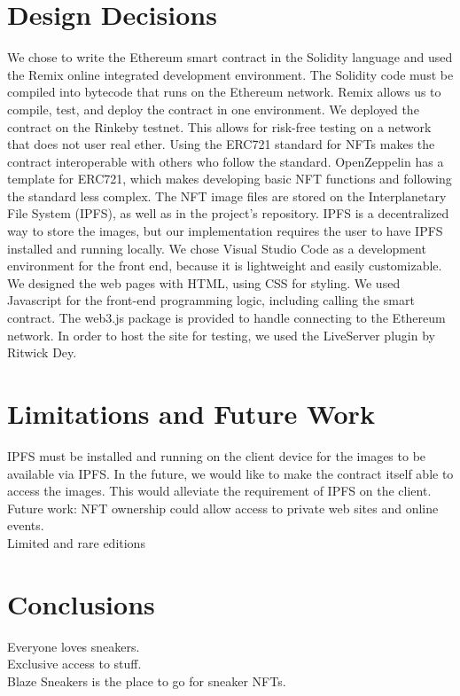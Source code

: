 \documentclass{article}
\begin{document}
\section{Design Decisions}
    We chose to write the Ethereum smart contract in the Solidity language and used the Remix online integrated development environment.
    The Solidity code must be compiled into bytecode that runs on the Ethereum network.
    Remix allows us to compile, test, and deploy the contract in one environment.
    We deployed the contract on the Rinkeby testnet. This allows for risk-free testing on a network that does not user real ether.
    \newline
    \indent
    Using the ERC721 standard for NFTs makes the contract interoperable with others who follow the standard.
    OpenZeppelin has a template for ERC721, which makes developing basic NFT functions and following the standard less complex.
    \newline
    \indent
    The NFT image files are stored on the Interplanetary File System (IPFS), as well as in the project's repository.
    IPFS is a decentralized way to store the images, but our implementation requires the user to have IPFS installed and running locally.
    \newline
    \indent
    We chose Visual Studio Code as a development environment for the front end, 
    because it is lightweight and easily customizable.
    We designed the web pages with HTML, using CSS for styling. 
    We used Javascript for the front-end programming logic, including calling the smart contract.
    The web3.js package is provided to handle connecting to the Ethereum network.
    In order to host the site for testing, we used the LiveServer plugin by Ritwick Dey.

\section{Limitations and Future Work}
    IPFS must be installed and running on the client device for the images to be available via IPFS. 
    In the future, we would like to make the contract itself able to access the images.
    This would alleviate the requirement of IPFS on the client.
    Future work: NFT ownership could allow access to private web sites and online events.\\
    Limited and rare editions 

\section{Conclusions}
    Everyone loves sneakers. \\
    Exclusive access to stuff.\\
    Blaze Sneakers is the place to go for sneaker NFTs.
\end{document}
